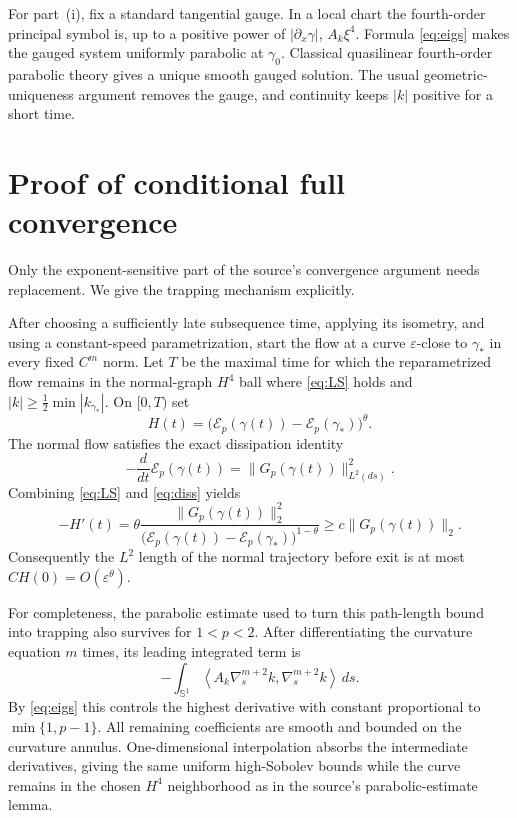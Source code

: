 \documentclass[11pt]{article}
\newcommand{\E}{\mathcal E_p}
\newcommand{\Sone}{\mathbb S^1}
\newcommand{\ip}[2]{\left\langle #1,#2\right\rangle}
\begin{document}
For part~\textup{(i)}, fix a standard tangential gauge.  In a local chart
the fourth-order principal symbol is, up to a positive power of
$|\partial_x\gamma|$, $A_k\xi^4$.  Formula \eqref{eq:eigs} makes the gauged
system uniformly parabolic at $\gamma_0$.  Classical quasilinear
fourth-order parabolic theory gives a unique smooth gauged solution.  The
usual geometric-uniqueness argument removes the gauge, and continuity keeps
$|k|$ positive for a short time.

\section*{Proof of conditional full convergence}

Only the exponent-sensitive part of the source's convergence argument needs
replacement.  We give the trapping mechanism explicitly.

After choosing a sufficiently late subsequence time, applying its isometry,
and using a constant-speed parametrization, start the flow at a curve
$\varepsilon$-close to $\gamma_*$ in every fixed $C^m$ norm.  Let $T$ be the
maximal time for which the reparametrized flow remains in the normal-graph
$H^4$ ball where \eqref{eq:LS} holds and $|k|\ge\frac12\min|k_{\gamma_*}|$.
On $[0,T)$ set
\[
 H(t)=\bigl(\E(\gamma(t))-\E(\gamma_*)\bigr)^\theta.
\]
The normal flow satisfies the exact dissipation identity
\begin{equation}\label{eq:diss}
 -\frac{d}{dt}\E(\gamma(t))=\|G_p(\gamma(t))\|_{L^2(ds)}^2.
\end{equation}
Combining \eqref{eq:LS} and \eqref{eq:diss} yields
\begin{equation}\label{eq:length}
 -H'(t)
 =\theta\frac{\|G_p(\gamma(t))\|_2^2}
 {\bigl(\E(\gamma(t))-\E(\gamma_*)\bigr)^{1-\theta}}
 \ge c\|G_p(\gamma(t))\|_2.
\end{equation}
Consequently the $L^2$ length of the normal trajectory before exit is at
most $C H(0)=O(\varepsilon^\theta)$.

For completeness, the parabolic estimate used to turn this path-length
bound into trapping also survives for $1<p<2$.  After differentiating the
curvature equation $m$ times, its leading integrated term is
\[
 -\int_{\Sone}
 \ip{A_k\nabla_s^{m+2}k}{\nabla_s^{m+2}k}\,ds.
\]
By \eqref{eq:eigs} this controls the highest derivative with constant
proportional to $\min\{1,p-1\}$.  All remaining coefficients are smooth and
bounded on the curvature annulus.  One-dimensional interpolation absorbs
the intermediate derivatives, giving the same uniform high-Sobolev bounds
while the curve remains in the chosen $H^4$ neighborhood as in the source's
parabolic-estimate lemma.
\end{document}
